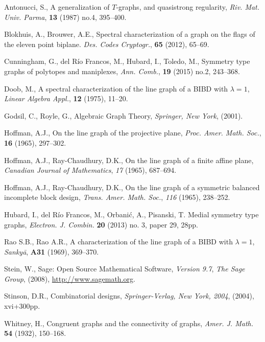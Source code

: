 \documentclass[letterpaper,10pt]{article}
\theoremstyle{plain}
\theoremstyle{definition}
\begin{document}
\begin{thebibliography}{}
     Antonucci, S., A generalization of $T$-graphs, and quasistrong regularity, {\em{Riv. Mat. Univ. Parma}}, {\bf{13}} (1987) no.4, 395--400.

     Blokhuis, A., Brouwer, A.E., Spectral characterization of a graph on the flags of the eleven point biplane. {\em{Des. Codes Cryptogr.}}, {\bf 65} (2012), 65--69.



     Cunningham, G., del R\'io Francos, M., Hubard, I., Toledo, M., Symmetry type graphs of polytopes and maniplexes, {\em{Ann. Comb.}}, {\bf{19}} (2015) no.2, 243--368.

     Doob, M., A spectral characterization of the line graph of a BIBD with $\lambda=1$, {\em{Linear Algebra Appl.}}, {\bf{12}} (1975), 11--20.

     Godsil, C., Royle, G., Algebraic Graph Theory, \emph{Springer, New York}, (2001).


     Hoffman, A.J., On the line graph of the projective plane, {\emph{Proc. Amer. Math. Soc.}}, {\bf{16}} (1965), 297--302.
    
     Hoffman, A.J., Ray-Chaudhury, D.K., On the line graph of a finite affine plane, {\emph{Canadian Journal of Mathematics}}, {\emph{17}} (1965), 687--694.

     Hoffman, A.J., Ray-Chaudhury, D.K., On the line graph of a symmetric balanced incomplete block design, {\emph{Trans. Amer. Math. Soc.}}, {\emph{116}} (1965), 238--252.

     Hubard, I., del R\'io Francos, M., Orbani\'c, A., Pisanski, T. Medial symmetry type graphs, {\em{Electron. J. Combin.}} {\bf{20}} (2013) no. 3, paper 29, 28pp. 

     Rao S.B., Rao A.R., A characterization of the line graph of a BIBD with $\lambda=1$, {\em{Sanky\=a}}, {\bf{A31}} (1969), 369--370.

     Stein, W., Sage: Open Source Mathematical Software, \emph{Version 9.7}, \emph{The Sage Group}, (2008), \url{http://www.sagemath.org}.

     Stinson, D.R., Combinatorial designs, {\em{Springer-Verlag, New York, 2004}}, (2004), xvi+300pp.

     Whitney, H., Congruent graphs and the connectivity of graphs, \emph{Amer. J. Math.} {\bf 54} (1932), 150--168.

\end{thebibliography}
\end{document}
